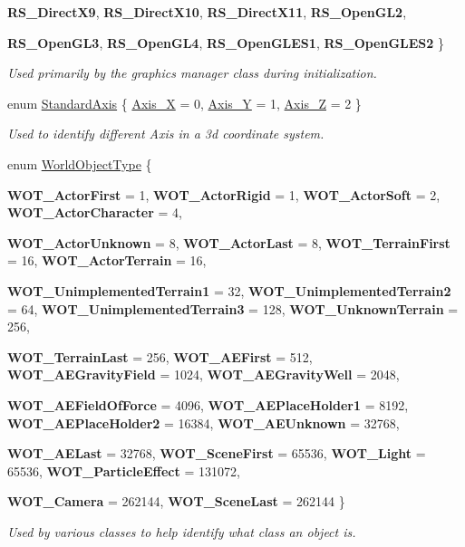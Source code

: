 \begin{DoxyCompactItemize}
{\bfseries RS\_\-DirectX9}, 
{\bfseries RS\_\-DirectX10}, 
{\bfseries RS\_\-DirectX11}, 
{\bfseries RS\_\-OpenGL2}, 
\par
{\bfseries RS\_\-OpenGL3}, 
{\bfseries RS\_\-OpenGL4}, 
{\bfseries RS\_\-OpenGLES1}, 
{\bfseries RS\_\-OpenGLES2}
 \}
\begin{DoxyCompactList}\small\item\em Used primarily by the graphics manager class during initialization. \item\end{DoxyCompactList}\item 
enum \hyperlink{namespaceMezzanine_ab41a00a8c6a47b576dc987ec34e16ba1}{StandardAxis} \{ \hyperlink{namespaceMezzanine_ab41a00a8c6a47b576dc987ec34e16ba1a823c8f182393aef96f017c7279d49126}{Axis\_\-X} =  0, 
\hyperlink{namespaceMezzanine_ab41a00a8c6a47b576dc987ec34e16ba1a935c7afe0104697553cf85e9214fb3fb}{Axis\_\-Y} =  1, 
\hyperlink{namespaceMezzanine_ab41a00a8c6a47b576dc987ec34e16ba1a6af6621383cc7da1fe11a86ba6de37c0}{Axis\_\-Z} =  2
 \}
\begin{DoxyCompactList}\small\item\em Used to identify different Axis in a 3d coordinate system. \item\end{DoxyCompactList}\item 
enum \hyperlink{namespaceMezzanine_a30335416fc857844e8360c84d1d1b56c}{WorldObjectType} \{ \par
{\bfseries WOT\_\-ActorFirst} =  1, 
{\bfseries WOT\_\-ActorRigid} =  1, 
{\bfseries WOT\_\-ActorSoft} =  2, 
{\bfseries WOT\_\-ActorCharacter} =  4, 
\par
{\bfseries WOT\_\-ActorUnknown} =  8, 
{\bfseries WOT\_\-ActorLast} =  8, 
{\bfseries WOT\_\-TerrainFirst} =  16, 
{\bfseries WOT\_\-ActorTerrain} =  16, 
\par
{\bfseries WOT\_\-UnimplementedTerrain1} =  32, 
{\bfseries WOT\_\-UnimplementedTerrain2} =  64, 
{\bfseries WOT\_\-UnimplementedTerrain3} =  128, 
{\bfseries WOT\_\-UnknownTerrain} =  256, 
\par
{\bfseries WOT\_\-TerrainLast} =  256, 
{\bfseries WOT\_\-AEFirst} =  512, 
{\bfseries WOT\_\-AEGravityField} =  1024, 
{\bfseries WOT\_\-AEGravityWell} =  2048, 
\par
{\bfseries WOT\_\-AEFieldOfForce} =  4096, 
{\bfseries WOT\_\-AEPlaceHolder1} =  8192, 
{\bfseries WOT\_\-AEPlaceHolder2} =  16384, 
{\bfseries WOT\_\-AEUnknown} =  32768, 
\par
{\bfseries WOT\_\-AELast} =  32768, 
{\bfseries WOT\_\-SceneFirst} =  65536, 
{\bfseries WOT\_\-Light} =  65536, 
{\bfseries WOT\_\-ParticleEffect} =  131072, 
\par
{\bfseries WOT\_\-Camera} =  262144, 
{\bfseries WOT\_\-SceneLast} =  262144
 \}
\begin{DoxyCompactList}\small\item\em Used by various classes to help identify what class an object is. \item\end{DoxyCompactList}\end{DoxyCompactItemize}
